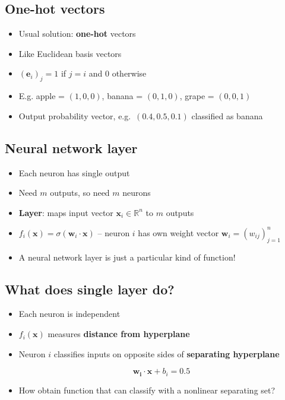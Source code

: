 \hypertarget{one-hot-vectors}{%
\subsection{One-hot vectors}\label{one-hot-vectors}}

\begin{itemize}
\item
  Usual solution: \textbf{one-hot} vectors
\item
  Like Euclidean basis vectors
\item
  \((\mathbf{e}_i)_j = 1\) if \(j=i\) and 0 otherwise
\item
  E.g. apple = \((1, 0, 0)\), banana = \((0, 1, 0)\), grape =
  \((0, 0, 1)\)
\item
  Output probability vector, e.g.~\((0.4, 0.5, 0.1)\) classified as
  banana
\end{itemize}

\hypertarget{neural-network-layer}{%
\subsection{Neural network layer}\label{neural-network-layer}}

\begin{itemize}
\item
  Each neuron has single output
\item
  Need \(m\) outputs, so need \(m\) neurons
\item
  \textbf{Layer}: maps input vector \(\mathbf{x}_i \in \mathbb{R}^n\) to
  \(m\) outputs
\item
  \(f_i(\mathbf{x}) = \sigma(\mathbf{w}_i \cdot \mathbf{x})\) -- neuron
  \(i\) has own weight vector \(\mathbf{w}_i = (w_{ij})_{j=1}^n\)
\item
  A neural network layer is just a particular kind of function!
\end{itemize}

\hypertarget{what-does-single-layer-do}{%
\subsection{What does single layer
do?}\label{what-does-single-layer-do}}

\begin{itemize}
\item
  Each neuron is independent
\item
  \(f_i(\mathbf{x})\) measures \textbf{distance from hyperplane}
\item
  Neuron \(i\) classifies inputs on opposite sides of \textbf{separating
  hyperplane}

  \[\mathbf{w_i} \cdot \mathbf{x} + b_i = 0.5\]
\item
  How obtain function that can classify with a nonlinear separating set?
\end{itemize}

